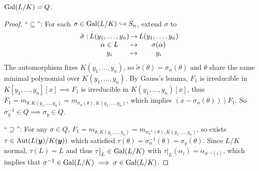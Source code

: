 \begin{prop}
  $\operatorname{Gal}(L/K) = Q$.

  \begin{proof}
    ``$\subseteq$'': For each $\sigma \in \operatorname{Gal}(L/K) \hookrightarrow S_n$, extend $\sigma$ to
    \[
      \arraycolsep=1pt
      \begin{array}{rccc}
        \tilde\sigma: & L(y_1, \dots, y_n) & \to & L(y_1, \dots, y_n) \\
        & \alpha \in L & \mapsto & \sigma(\alpha) \\
        & y_i & \mapsto & y_i
      \end{array}
    \]
    The automorphism fixes $K(y_1, \dots, y_n)$, so
    $\tilde\sigma(\theta) = \sigma_\alpha(\theta)$ and $\theta$ share the
    same minimal polynomial over $K(y_1, \dots, y_n)$.
    By Gauss's lemma, $F_1$ is irreducible in $K[y_1, \dots, y_n][x] \implies F_1$
    is irreducible in $K(y_1, \dots, y_n)[x]$, thus
    $F_1 = m_{\theta, K(y_1, \dots, y_n)}
    = m_{\sigma_\alpha(\theta), K(y_1, \dots, y_n)}$, which implies $(x - \sigma_\alpha(\theta)) \mid F_1$.
    So $\sigma_y^{-1} \in Q \implies \sigma_y \in Q$.

    ``$\supseteq$'': For any $\sigma \in Q$, $F_1 = m_{\theta, K(y_1, \dots, y_n)}
    = m_{\sigma^{-1}_\alpha(\theta), K(y_1, \dots, y_n)}$, so exists
    $\tau \in \operatorname{Aut}(L(\bm{y}) / K(\bm{y}))$ which satisfied
    $\tau(\theta) = \sigma_\alpha^{-1}(\theta) = \sigma_y(\theta)$.
    Since $L/K$ normal, $\tau(L) = L$ and thus $\tau\big|_L \in \operatorname{Gal}(L/K)$ with
    $\tau\big|_L(\alpha_i) = \alpha_{\sigma^{-1}(i)}$, which implies that
    $\sigma^{-1} \in \operatorname{Gal}(L/K) \implies \sigma \in \operatorname{Gal}(L/K)$.
  \end{proof}
\end{prop}

